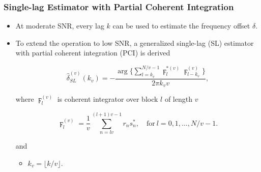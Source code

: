 \begin{frame}
  \frametitle{Single-lag Estimator with Partial Coherent Integration}

    \begin{itemize}
    
      \item At moderate SNR, every lag $k$ can be used to estimate the frequency offset $\delta$. 
      
      
      \item To extend the operation to low SNR, a generalized single-lag (SL) estimator with partial coherent integration (PCI) is derived
      
      \begin{equation}
        \label{eq:single_lag_estimator_w_partial_corr}
        \hat{\delta}_{SL}^{(v)}(k_v)=-\frac{\arg\big\{\sum_{l=k_v}^{N/v-1}\digamma_l^{*(v)}\digamma_{l-k_v}^{(v)}\big\}}{2\pi k_vv},
      \end{equation}

      where $\digamma_{l}^{(v)}$ is coherent integrator over block $l$
      of length $v$

      \begin{equation}
        \label{eq:coherent_integrator}
        \digamma_l^{(v)}=\frac{1}{v}\sum_{n=lv}^{(l+1)v-1}r_ns_n^*, \quad \text{for}~l=0,1,\ldots,N/v{-}1.
      \end{equation}

      and 
      \begin{itemize}
        \item  $k_v=\lfloor k/v \rfloor$.
      \end{itemize}

    \end{itemize}



\end{frame}



